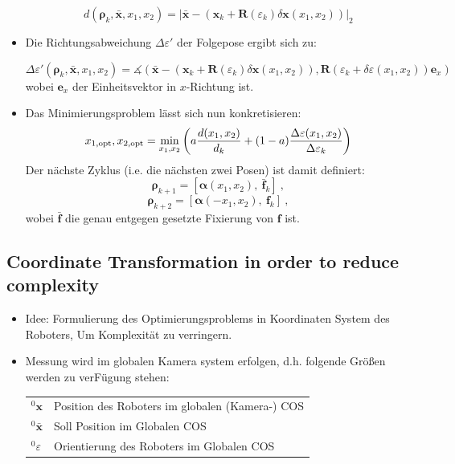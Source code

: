 \documentclass[10pt,a4paper]{article}
\begin{document}
\begin{itemize}
	\begin{equation}
	d(\bm{\rho}_k, \bar{\bm{x}}, x_1, x_2) = \bigg| \bar{\bm{x}} - \left(\bm{x}_{k} + \bm{R}(\varepsilon_k) \delta \bm{x}(x_1, x_2) \right)\bigg|_2
	\end{equation}	
	
	\item Die Richtungsabweichung $\Delta \varepsilon'$ der Folgepose ergibt sich zu:
	
	\begin{equation}
	\Delta \varepsilon' (\bm{\rho}_k, \bar{\bm{x}}, x_1, x_2) = \measuredangle\left( \bar{\bm{x}} - \left(\bm{x}_{k} + \bm{R}(\varepsilon_k) \delta \bm{x}(x_1,x_2) \right), \bm{R}(\varepsilon_k + \delta \varepsilon (x_1, x_2)) \bm{e}_x \right)
	\end{equation}	
	wobei $\bm{e}_x$ der Einheitsvektor in $x$-Richtung ist.
	
	\item Das Minimierungsproblem lässt sich nun konkretisieren:
	\begin{equation}
	x_{1, \textnormal{opt}}, x_{2, \textnormal{opt}} = \min_{x_1, x_2} \left( a \frac{d(x_1, x_2)}{d_k} + (1-a)\frac{\Delta \varepsilon (x_1, x_2)}{\Delta \varepsilon_k} \right)	
	\end{equation}
	Der nächste Zyklus (i.e. die nächsten zwei Posen) ist damit definiert: 
	\begin{equation}
	\bm{\rho}_{k+1} = [\bm{\alpha}(x_1, x_2),~ \bar{\bm{f}}_k]~,
	\end{equation}
	\begin{equation}
	\bm{\rho}_{k+2} = [\bm{\alpha}(-x_1, x_2),~ {\bm{f}}_k]~,
	\end{equation}
	wobei $\bar{\bm{f}}$ die genau entgegen gesetzte Fixierung von $\bm{f}$ ist.
	
	
\end{itemize}


\subsection{Coordinate Transformation in order to reduce complexity}

\begin{itemize}
	\item Idee: Formulierung des Optimierungsproblems in Koordinaten System des Roboters, Um Komplexität zu verringern.
	\item Messung wird im globalen Kamera system erfolgen, d.h. folgende Größen werden zu verFügung stehen:
	
	\begin{tabular}{ll}
	$^0\bm{x}$ & Position des Roboters im globalen (Kamera-) COS \\
	$^0\bar{\bm{x}}$ & Soll Position im Globalen COS \\
	$^0\varepsilon$ & Orientierung des Roboters im Globalen COS \\
	
	\end{tabular}
	
\end{itemize}
\end{document}
